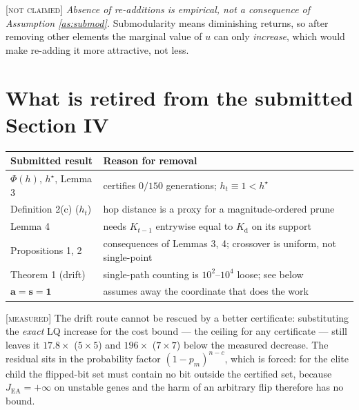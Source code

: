 \documentclass[11pt]{article}
\theoremstyle{definition}
\theoremstyle{remark}
\newcommand{\JEA}{J_{\mathrm{EA}}}
\newcommand{\Kd}{K_{\mathrm{d}}}
\newcommand{\tagged}[1]{\textsc{[#1]}}
\begin{document}
\medskip
\noindent
\tagged{not claimed} \emph{Absence of re-additions is empirical, not a consequence
of Assumption \ref{as:submod}.} Submodularity means diminishing returns, so after
removing other elements the marginal value of $u$ can only \emph{increase},
which would make re-adding it more attractive, not less.

\section{What is retired from the submitted Section IV}

\begin{center}
\begin{tabular}{ll}
\toprule
Submitted result & Reason for removal \\
\midrule
$\Phi(h)$, $h^\star$, Lemma 3 & certifies $0/150$ generations; $h_t \equiv 1 < h^\star$ \\
Definition 2(c) ($h_t$) & hop distance is a proxy for a magnitude-ordered prune \\
Lemma 4 & needs $K_{t-1}$ entrywise equal to $\Kd$ on its support \\
Propositions 1, 2 & consequences of Lemmas 3, 4; crossover is uniform, not single-point \\
Theorem 1 (drift) & single-path counting is $10^2$--$10^4$ loose; see below \\
$\mathbf{a} = \mathbf{s} = \mathbf{1}$ & assumes away the coordinate that does the work \\
\bottomrule
\end{tabular}
\end{center}

\tagged{measured} The drift route cannot be rescued by a better certificate:
substituting the \emph{exact} LQ increase for the cost bound --- the ceiling for
any certificate --- still leaves it $17.8\times$ ($5\times5$) and $196\times$
($7\times7$) below the measured decrease. The residual sits in the probability
factor $(1-p_m)^{n-c}$, which is forced: for the elite child the flipped-bit set
must contain no bit outside the certified set, because $\JEA = +\infty$ on
unstable genes and the harm of an arbitrary flip therefore has no bound.
\end{document}
